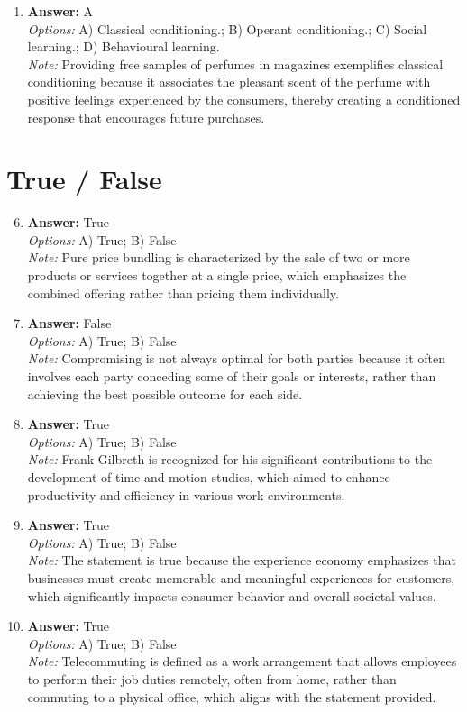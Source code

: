 \documentclass[12pt]{article}
\begin{document}
\begin{enumerate}[label=\arabic*.]
\item \textbf{Answer:} A
\\ \textit{Options:} A) Classical conditioning.; B) Operant conditioning.; C) Social learning.; D) Behavioural learning.
\\ \textit{Note:} Providing free samples of perfumes in magazines exemplifies classical conditioning because it associates the pleasant scent of the perfume with positive feelings experienced by the consumers, thereby creating a conditioned response that encourages future purchases.
\end{enumerate}

\section*{True / False}
\begin{enumerate}[label=\arabic*.]
\setcounter{enumi}{5}
\item \textbf{Answer:} True
\\ \textit{Options:} A) True; B) False
\\ \textit{Note:} Pure price bundling is characterized by the sale of two or more products or services together at a single price, which emphasizes the combined offering rather than pricing them individually.
\item \textbf{Answer:} False
\\ \textit{Options:} A) True; B) False
\\ \textit{Note:} Compromising is not always optimal for both parties because it often involves each party conceding some of their goals or interests, rather than achieving the best possible outcome for each side.
\item \textbf{Answer:} True
\\ \textit{Options:} A) True; B) False
\\ \textit{Note:} Frank Gilbreth is recognized for his significant contributions to the development of time and motion studies, which aimed to enhance productivity and efficiency in various work environments.
\item \textbf{Answer:} True
\\ \textit{Options:} A) True; B) False
\\ \textit{Note:} The statement is true because the experience economy emphasizes that businesses must create memorable and meaningful experiences for customers, which significantly impacts consumer behavior and overall societal values.
\item \textbf{Answer:} True
\\ \textit{Options:} A) True; B) False
\\ \textit{Note:} Telecommuting is defined as a work arrangement that allows employees to perform their job duties remotely, often from home, rather than commuting to a physical office, which aligns with the statement provided.
\end{enumerate}
\end{document}

